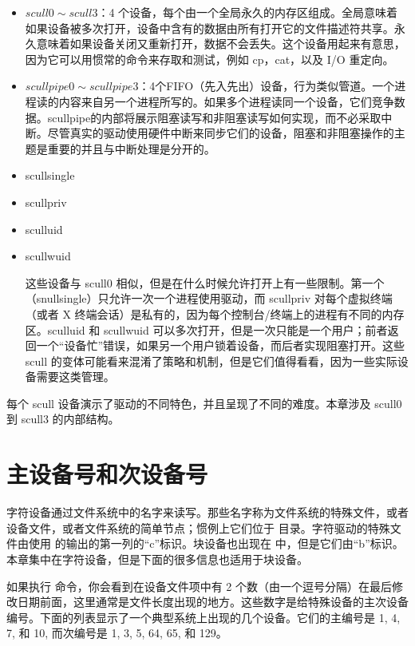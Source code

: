 \documentclass[lang=cn,newtx,10pt,scheme=chinese]{elegantbook}
\begin{document}
\begin{itemize}
    \item $scull0 \sim scull3$：4 个设备，每个由一个全局永久的内存区组成。全局意味着如果设备被多次打开，设备中含有的数据由所有打开它的文件描述符共享。永久意味着如果设备关闭又重新打开，数据不会丢失。这个设备用起来有意思，因为它可以用惯常的命令来存取和测试，例如 cp，cat，以及 I/O 重定向。
    \item $scullpipe0 \sim scullpipe3$：4个FIFO（先入先出）设备，行为类似管道。一个进程读的内容来自另一个进程所写的。如果多个进程读同一个设备，它们竞争数据。scullpipe的内部将展示阻塞读写和非阻塞读写如何实现，而不必采取中断。尽管真实的驱动使用硬件中断来同步它们的设备，阻塞和非阻塞操作的主题是重要的并且与中断处理是分开的。
    \item scullsingle
    \item scullpriv
    \item sculluid
    \item scullwuid
    
这些设备与 scull0 相似，但是在什么时候允许打开上有一些限制。第一个（snullsingle）只允许一次一个进程使用驱动，而 scullpriv 对每个虚拟终端（或者 X 终端会话）是私有的，因为每个控制台/终端上的进程有不同的内存区。sculluid 和 scullwuid 可以多次打开，但是一次只能是一个用户；前者返回一个``设备忙''错误，如果另一个用户锁着设备，而后者实现阻塞打开。这些 scull 的变体可能看来混淆了策略和机制，但是它们值得看看，因为一些实际设备需要这类管理。
\end{itemize}

每个 scull 设备演示了驱动的不同特色，并且呈现了不同的难度。本章涉及 scull0 到 scull3 的内部结构。

\section{主设备号和次设备号}

字符设备通过文件系统中的名字来读写。那些名字称为文件系统的特殊文件，或者设备文件，或者文件系统的简单节点；惯例上它们位于  目录。字符驱动的特殊文件由使用  的输出的第一列的``c''标识。块设备也出现在  中，但是它们由``b''标识。本章集中在字符设备，但是下面的很多信息也适用于块设备。

如果执行  命令，你会看到在设备文件项中有 2 个数（由一个逗号分隔）在最后修改日期前面，这里通常是文件长度出现的地方。这些数字是给特殊设备的主次设备编号。下面的列表显示了一个典型系统上出现的几个设备。它们的主编号是 1, 4, 7, 和 10, 而次编号是 1, 3, 5, 64, 65, 和 129。
\end{document}
